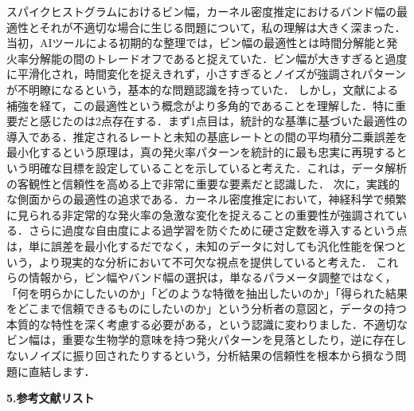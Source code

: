 \documentclass{classes/report}
\begin{document}
スパイクヒストグラムにおけるビン幅，カーネル密度推定におけるバンド幅の最適性とそれが不適切な場合に生じる問題について，私の理解は大きく深まった．
当初，AIツールによる初期的な整理では，ビン幅の最適性とは時間分解能と発火率分解能の間のトレードオフであると捉えていた．ビン幅が大きすぎると過度に平滑化され，時間変化を捉えきれず，小さすぎるとノイズが強調されパターンが不明瞭になるという，基本的な問題認識を持っていた．
しかし，文献による補強を経て，この最適性という概念がより多角的であることを理解した．特に重要だと感じたのは2点存在する．まず1点目は，統計的な基準に基づいた最適性の導入である．推定されるレートと未知の基底レートとの間の平均積分二乗誤差を最小化するという原理は，真の発火率パターンを統計的に最も忠実に再現するという明確な目標を設定していることを示していると考えた．これは，データ解析の客観性と信頼性を高める上で非常に重要な要素だと認識した．
次に，実践的な側面からの最適性の追求である．カーネル密度推定において，神経科学で頻繁に見られる非定常的な発火率の急激な変化を捉えることの重要性が強調されている．さらに過度な自由度による過学習を防ぐために硬さ定数を導入するという点は，単に誤差を最小化するだでなく，未知のデータに対しても汎化性能を保つという，より現実的な分析において不可欠な視点を提供していると考えた．
これらの情報から，ビン幅やバンド幅の選択は，単なるパラメータ調整ではなく，「何を明らかにしたいのか」「どのような特徴を抽出したいのか」「得られた結果をどこまで信頼できるものにしたいのか」という分析者の意図と，データの持つ本質的な特性を深く考慮する必要がある，という認識に変わりました．不適切なビン幅は，重要な生物学的意味を持つ発火パターンを見落としたり，逆に存在しないノイズに振り回されたりするという，分析結果の信頼性を根本から損なう問題に直結します．

\textbf{\large 5.参考文献リスト}

\printbibliography[heading=none]
\end{document}
